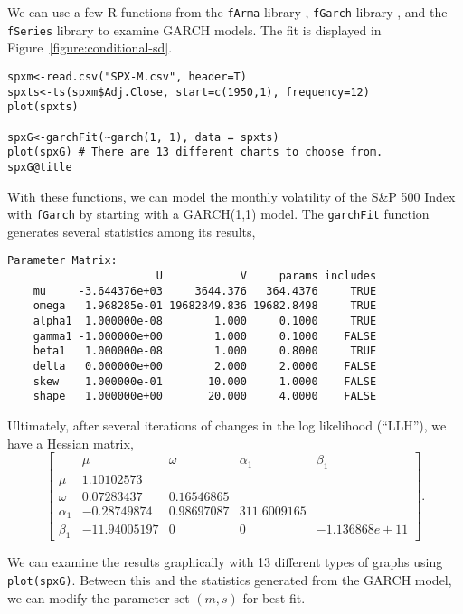 We can use a few R functions from the \texttt{fArma} library \cite{farma-R}, \texttt{fGarch} library \cite{fgarch-R}, and the \texttt{fSeries} library \cite{fseries-R} to examine GARCH models. The fit is displayed in Figure~\ref{figure:conditional-sd}.
\begin{verbatim}
spxm<-read.csv("SPX-M.csv", header=T)
spxts<-ts(spxm$Adj.Close, start=c(1950,1), frequency=12)
plot(spxts)

spxG<-garchFit(~garch(1, 1), data = spxts)
plot(spxG) # There are 13 different charts to choose from.
spxG@title
\end{verbatim}

With these functions, we can model the monthly volatility of the S\&P 500 Index with \texttt{fGarch} by starting with a GARCH(1,1) model. The \texttt{garchFit} function generates several statistics among its results,
\begin{verbatim}
Parameter Matrix:
                       U            V     params includes
    mu     -3.644376e+03     3644.376   364.4376     TRUE
    omega   1.968285e-01 19682849.836 19682.8498     TRUE
    alpha1  1.000000e-08        1.000     0.1000     TRUE
    gamma1 -1.000000e+00        1.000     0.1000    FALSE
    beta1   1.000000e-08        1.000     0.8000     TRUE
    delta   0.000000e+00        2.000     2.0000    FALSE
    skew    1.000000e-01       10.000     1.0000    FALSE
    shape   1.000000e+00       20.000     4.0000    FALSE
\end{verbatim}
Ultimately, after several iterations of changes in the log likelihood (``LLH''), we have a Hessian matrix,
\[
\begin{bmatrix}
      &          \mu  &    \omega   &  \alpha_1    &   \beta_1 \\
\mu    &   1.10102573  \\
\omega &   0.07283437 & 0.16546865 \\
\alpha_1 &  -0.28749874 & 0.98697087 & 311.6009165 \\
\beta_1 & -11.94005197 & 0 &  0  & -1.136868e+11
\end{bmatrix}.
\]

\pagebreak
We can examine the results graphically with 13 different types of graphs using \texttt{plot(spxG)}.  Between this and the statistics generated from the GARCH model, we can modify the parameter set $(m,s)$ for best fit.

